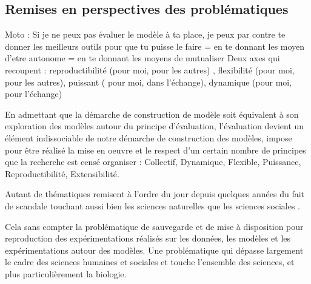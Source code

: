 {%

\subsection{Remises en perspectives des problématiques}

Moto : Si je ne peux pas évaluer le modèle à ta place, je peux par contre te donner les meilleurs outils pour que tu puisse le faire 
= en te donnant les moyen d'etre autonome
= en te donnant les moyens de mutualiser
Deux axes qui recoupent : reproductibilité (pour moi, pour les autres) , flexibilité (pour moi, pour les autres), puissant ( pour moi, dans l'échange), dynamique (pour moi, pour l'échange)

En admettant que la démarche de construction de modèle soit équivalent à son exploration des modèles autour du principe d'évaluation, l'évaluation devient un élément indissociable de notre démarche de construction des modèles, impose pour être réalisé la mise en oeuvre et le respect d'un certain nombre de principes que la recherche est censé organiser : Collectif, Dynamique, Flexible, Puissance, Reproductibilité, Extensibilité. 

Autant de thématiques remisent à l'ordre du jour depuis quelques années du fait de scandale touchant aussi bien les sciences naturelles que les sciences sociales \autocite{OpenScience2012}. 

Cela sans compter la problématique de sauvegarde \autocite{Vines2013} \autocite{Turner2013} et de mise à disposition pour reproduction des expérimentations réalisés sur les données, les modèles et les expérimentations autour des modèles. Une problématique qui dépasse largement le cadre des sciences humaines et sociales et touche l'ensemble des sciences, et plus particulièrement la biologie. 

}
